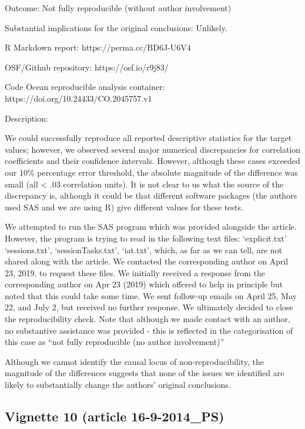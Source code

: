 \documentclass[english,,man,floatsintext]{apa6}
\begin{document}
\begin{appendix}
Outcome: Not fully reproducible (without author involvement)

Substantial implications for the original conclusions: Unlikely.

R Markdown report: https://perma.cc/BD6J-U6V4

OSF/Github repository: https://osf.io/r9j83/

Code Ocean reproducible analysis container:
https://doi.org/10.24433/CO.2045757.v1

Description:

We could successfully reproduce all reported descriptive statistics for
the target values; however, we observed several major numerical
discrepancies for correlation coefficients and their confidence
intervals. However, although these cases exceeded our 10\% percentage
error threshold, the absolute magnitude of the difference was small (all
\textless{} .03 correlation units). It is not clear to us what the
source of the discrepancy is, although it could be that different
software packages (the authors used SAS and we are using R) give
different values for these tests.

We attempted to run the SAS program which was provided alongside the
article. However, the program is trying to read in the following text
files: `explicit.txt' `sessions.txt', `sessionTasks.txt', `iat.txt',
which, as far as we can tell, are not shared along with the article. We
contacted the corresponding author on April 23, 2019, to request these
files. We initially received a response from the corresponding author on
Apr 23 (2019) which offered to help in principle but noted that this
could take some time. We sent follow-up emails on April 25, May 22, and
July 2, but received no further response. We ultimately decided to close
the reproducibility check. Note that although we made contact with an
author, no substantive assistance was provided - this is reflected in
the categorisation of this case as ``not fully reproducible (no author
involvement)''

Although we cannot identify the causal locus of non-reproducibility, the
magnitude of the differences suggests that none of the issues we
identified are likely to substantially change the authors' original
conclusions.

\hypertarget{vignette-10-article-16-9-2014_ps}{%
\subsection{Vignette 10 (article
16-9-2014\_PS)}\label{vignette-10-article-16-9-2014_ps}}


\end{appendix}
\end{document}
